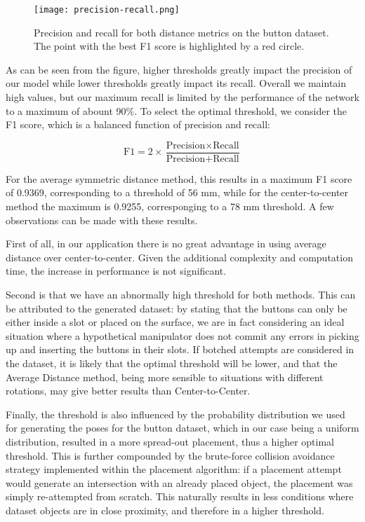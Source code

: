 \begin{figure}[ht]
    \texttt{[image: precision-recall.png]}
    \caption{Precision and recall for both distance metrics on the button dataset. The point with the best F1 score is highlighted by a red circle.}
    \label{fig:precisionrecall}
\end{figure}

As can be seen from the figure, higher thresholds greatly impact the precision of our model while lower thresholds greatly impact its recall. Overall we maintain high values, but our maximum recall is limited by the performance of the network to a maximum of abount 90\%. To select the optimal threshold, we consider the F1 score, which is a balanced function of precision and recall:

\begin{equation*}
    \text{F1} = 2\times\frac{\text{Precision}\times\text{Recall}}{\text{Precision}+\text{Recall}}
\end{equation*}

For the average symmetric distance method, this results in a maximum F1 score of 0.9369, corresponding to a threshold of 56 mm, while for the center-to-center method the maximum is 0.9255, corresponging to a 78 mm threshold. A few observations can be made with these results.

First of all, in our application there is no great advantage in using average distance over center-to-center. Given the additional complexity and computation time, the increase in performance is not significant.

Second is that we have an abnormally high threshold for both methods. This can be attributed to the generated dataset: by stating that the buttons can only be either inside a slot or placed on the surface, we are in fact considering an ideal situation where a hypothetical manipulator does not commit any errors in picking up and inserting the buttons in their slots. If botched attempts are considered in the dataset, it is likely that the optimal threshold will be lower, and that the Average Distance method, being more sensible to situations with different rotations, may give better results than Center-to-Center.

Finally, the threshold is also influenced by the probability distribution we used for generating the poses for the button dataset, which in our case being a uniform distribution, resulted in a more spread-out placement, thus a higher optimal threshold. This is further compounded by the brute-force collision avoidance strategy implemented within the placement algorithm: if a placement attempt would generate an intersection with an already placed object, the placement was simply re-attempted from scratch. This naturally results in less conditions where dataset objects are in close proximity, and therefore in a higher threshold.